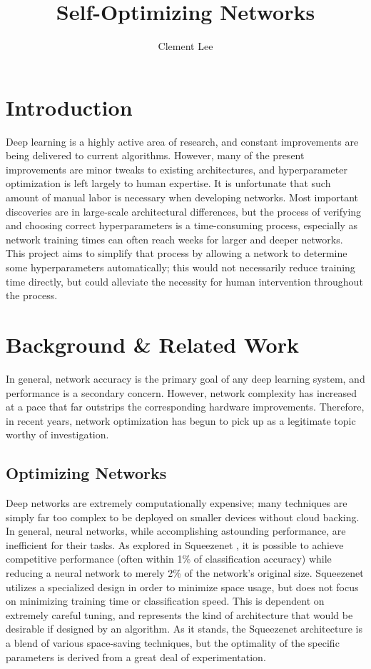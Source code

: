 \documentclass[12pt]{article}
\title{Self-Optimizing Networks}
\author{Clement Lee}
\date{}
\begin{document}
\maketitle

\section{Introduction}
Deep learning is a highly active area of research, and constant improvements are being delivered to current algorithms.
However, many of the present improvements are minor tweaks to existing architectures, and hyperparameter optimization is left largely to human expertise.
It is unfortunate that such amount of manual labor is necessary when developing networks.
Most important discoveries are in large-scale architectural differences, but the process of verifying and choosing correct hyperparameters is a time-consuming process, especially as network training times can often reach weeks for larger and deeper networks.
This project aims to simplify that process by allowing a network to determine some hyperparameters automatically; this would not necessarily reduce training time directly, but could alleviate the necessity for human intervention throughout the process.

\section{Background \& Related Work}
In general, network accuracy is the primary goal of any deep learning system, and performance is a secondary concern.
However, network complexity has increased at a pace that far outstrips the corresponding hardware improvements.
Therefore, in recent years, network optimization has begun to pick up as a legitimate topic worthy of investigation.

\subsection{Optimizing Networks}
Deep networks are extremely computationally expensive; many techniques are simply far too complex to be deployed on smaller devices without cloud backing.
In general, neural networks, while accomplishing astounding performance, are inefficient for their tasks.
As explored in Squeezenet \cite{iandola2016squeezenet}, it is possible to achieve competitive performance (often within 1\% of classification accuracy) while reducing a neural network to merely 2\% of the network's original size.
Squeezenet utilizes a specialized design in order to minimize space usage, but does not focus on minimizing training time or classification speed.
This is dependent on extremely careful tuning, and represents the kind of architecture that would be desirable if designed by an algorithm.
As it stands, the Squeezenet architecture is a blend of various space-saving techniques, but the optimality of the specific parameters is derived from a great deal of experimentation.
\end{document}
